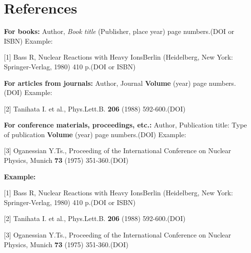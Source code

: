 \documentclass[12pt,a4paper,twoside]{article}
\begin{document}
\section*{References }

\textbf{For books: }
Author, \textit{Book title} (Publisher, place year) page numbers.(DOI or ISBN) Example:

[1]	Bass R, Nuclear Reactions with Heavy IonsBerlin (Heidelberg, New York: Springer-Verlag, 1980) 410 p.(DOI or ISBN)

\textbf{For articles from journals:}
Author, Journal \textbf{Volume} (year) page numbers.(DOI) Example:

[2] Tanihata I. et al., Phys.Lett.B. \textbf{206} (1988) 592-600.(DOI)

\textbf{For conference materials, proceedings, etc.:}
Author, Publication title: Type of publication \textbf{Volume} (year) page numbers.(DOI) Example:

[3] Oganessian Y.Ts., Proceeding of the International Conference on Nuclear Physics, Munich \textbf{73} (1975) 351-360.(DOI)

\begin{flushleft}
\textbf{Example: }


[1] Bass R, Nuclear Reactions with Heavy IonsBerlin (Heidelberg, New York: Springer-Verlag, 1980) 410 p.(DOI or ISBN)

[2] Tanihata I. et al., Phys.Lett.B. \textbf{206} (1988) 592-600.(DOI)

[3] Oganessian Y.Ts., Proceeding of the International Conference on Nuclear Physics, Munich \textbf{73} (1975) 351-360.(DOI)

\end{flushleft}
\end{document}

